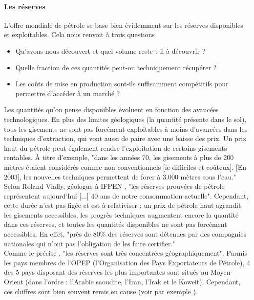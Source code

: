 \paragraph{Les réserves}
L’offre mondiale de pétrole se base bien évidemment sur les réserves disponibles et exploitables. Cela nous renvoit à trois questions \cite{rapSenat}
\begin{itemize}
	\item Qu’avons-nous découvert et quel volume reste-t-il à découvrir ?
	\item Quelle fraction de ces quantités peut-on techniquement récupérer ?
	\item Les coûts de mise en production sont-ils suffisamment compétitifs pour permettre d’accéder à un marché ?
\end{itemize}
Les quantités qu’on pense disponibles évoluent en fonction des avancées technologiques. En plus des limites géologiques (la quantité présente dans le sol), tous les gisements ne sont pas forcément exploitables à moins d’avancées dans les techniques d’extraction, qui vont aussi de paire avec une baisse des prix. Un prix haut du pétrole peut également rendre l’exploitation de certains gisements rentables. À titre d’exemple, "dans les années 70, les gisements à plus de 200 mètres étaient considérés comme non conventionnels [ie difficiles et coûteux]. [En 2003], les nouvelles techniques permettent de forer à 3.000 mètres sous l’eau." \\
Selon Roland Vially, géologue à IFPEN \cite{IFPEnerNvlles}, "les réserves prouvées de pétrole représentent aujourd’hui [...] 40 ans de notre consommation actuelle". Cependant, cette durée n’est pas figée et est à relativiser ; un prix de pétrole haut agrandit les gisements accessibles, les progrès techniques augmentent encore la quantité dans ces réserves, et toutes les quantités disponibles ne sont pas forcément accessibles. En effet, "près de 80\% des réserves sont détenues par des compagnies nationales qui n’ont pas l’obligation de les faire certifier."\\
Comme le précise \cite{rapSenat}, "les réserves sont très concentrées géographiquement". Parmis les pays membres de l’OPEP (l’Organisation des Pays Exportateurs de Pétrole), 4 des 5 pays disposant des réserves les plus importantes sont situés au Moyen-Orient (dans l’ordre : l’Arabie saoudite, l’Iran, l’Irak et le Koweit). Cependant, ces chiffres sont bien souvent remis en cause (voir par exemple \cite{simmons2005twilight}).


